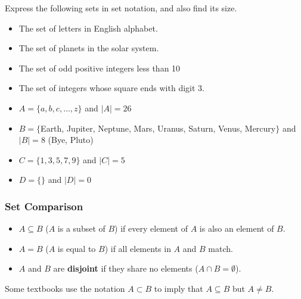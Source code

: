 \begin{frame}[t]
\begin{ex}
Express the following sets in set notation, and also find its size.
\begin{itemize}
\item The set of letters in English alphabet.
\item The set of planets in the solar system.
\item The set of odd positive integers less than 10
\item The set of integers whose square ends with digit 3.
\end{itemize}
\end{ex}
\begin{sol}
\begin{itemize}
\item $A = \{a,b,c,\ldots,z\}$ and $|A| = 26$
\item $B = \{$Earth, Jupiter, Neptune, Mars, Uranus, Saturn, Venus, Mercury$\}$ and $|B| = 8$ (Bye, Pluto)
\item $C = \{1,3,5,7,9\}$ and $|C| = 5$
\item $D = \{\}$ and $|D| = 0$
\end{itemize}
\end{sol}
\end{frame}

\begin{frame}
\frametitle{Set Comparison}
\begin{defn}{}{}
\begin{itemize}
\item $A \subseteq B$ ($A$ is a subset of $B$) if every element of $A$ is also an element of $B$. 
\item $A = B$ ($A$ is equal to $B$) if all elements in $A$ and $B$ match. 
\item $A$ and $B$ are \textbf{disjoint} if they share no elements ($A \cap B = \emptyset$).
\end{itemize}
\end{defn}
\begin{remark}{}{}
Some textbooks use the notation $A \subset B$ to imply that $A \subseteq B$ but $A \neq B$. 
\end{remark}
\end{frame}


